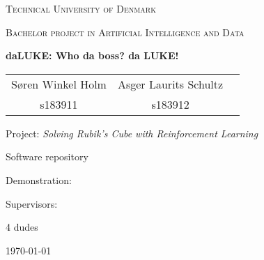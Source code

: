 \documentclass[12pt,fleqn]{report}
\numberwithin{equation}{chapter}
\numberwithin{footnote}{chapter}
\numberwithin{figure}{chapter}
\numberwithin{table}{chapter}
\begin{document}
\begin{titlepage}
    \centering
    {\scshape\LARGE Technical University of Denmark \par}
    \vspace{1cm}
    {\scshape\Large Bachelor project in Artificial Intelligence and Data\par}
    \vspace{1.5cm}
    {\huge\bfseries daLUKE: Who da boss? da LUKE! \par}
    \vspace{2cm}
    \begin{large}
        \centering
        \begin{tabular}{ccc}
                Søren Winkel Holm & Asger Laurits Schultz\\
                s183911 & s183912
        \end{tabular}
    \end{large}\par
    \vfill
    Project: \textit{Solving Rubik's Cube with Reinforcement Learning}\par
    Software repository
    \par
    Demonstration:
    \par
    \vspace{2cm}
    Supervisors:\par
    4 dudes
    \vfill
    {\large \today\par}
\end{titlepage}
\begin{abstract}
    Every heard of LUKE skyWALKER? Now he do be speaking danglish
\end{abstract}

\setcounter{tocdepth}{1}
\tableofcontents
\setcounter{tocdepth}{2}

% 

% 

% 

% 

% 

% 

\printbibliography[heading=bibintoc]

% 
\end{document}

